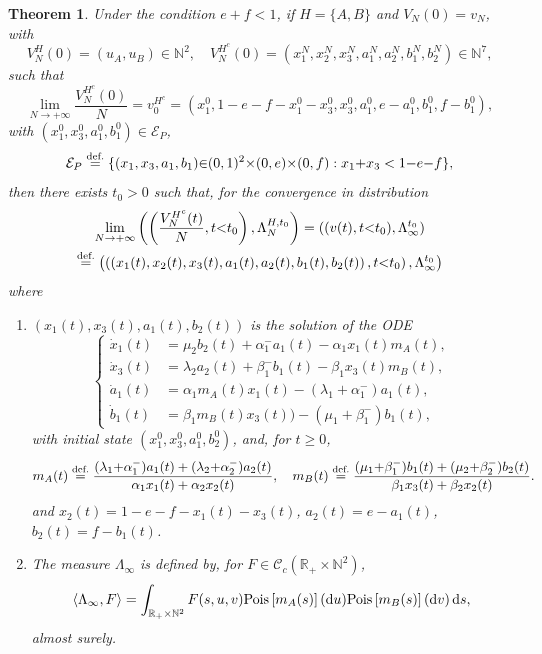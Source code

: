 \documentclass[english]{amsart}
\newcommand{\N}{\ensuremath{\mathbb{N}}}
\newcommand{\R}{\ensuremath{\mathbb{R}}}
\newcommand{\diff}{\mathop{}\mathopen{}\mathrm{d}}
\newcommand{\cal}[1]{\ensuremath{\mathcal{#1}}}
\newcommand\croc[1]{\left\langle #1\right\rangle}
\newcommand\steq[1]{\stackrel{\text{\rm #1.}}{=}}
\newcommand\Pois[1]{{\rm Pois}\left[#1\right]}
\newtheorem{theorem}[proposition]{Theorem}
\numberwithin{proposition}{section}
\begin{document}
\begin{theorem}\label{ThM1M}
Under the condition $e{+}f{<}1$, if $H{=}\{{ A}, { B}\}$ and $V_N(0){=}v_N$,  with
\[
V_N^H(0)=(u_A,u_B)\in\N^2, \quad V_N^{H^c}(0)=(x_1^N,x^N_2,x^N_3, a_1^N,a_2^N,b_1^N,b_2^N)\in\N^7,
\]
such that
\[
\lim_{N\to+\infty}\frac{V_N^{H^c}(0)}{N}=v_0^{H^c}=(x_1^0,1{-}e{-}f{-}x_1^0{-}x_3^0,x_3^0,a_1^0,e{-}a_1^0,b_1^0,f{-}b_1^0),
\]
with $(x_1^0,x_3^0,a_1^0,b_1^0){\in}{\cal E}_P$,
\[
{\cal E}_P\steq{def}\{(x_1,x_3,a_1,b_1){\in}(0,1)^2{\times}(0,e){\times}(0,f): x_1{+}x_3<1{-}e{-}f\},
\]
 then there exists $t_0{>}0$ such that, for the convergence in distribution
\begin{multline}\label{CVWM}
  \lim_{N\to+\infty}\left(\left(\frac{V_N^{H^c}(t)}{N}, t{<}t_0\right),\Lambda_N^{H,t_0}\right)=((v(t),t{<}t_0),\Lambda_\infty^{t_0})\\
\steq{def}\left(\left(\left({x}_1(t),{x}_2(t),{x}_3(t),{a}_1(t),{a}_2(t),{b}_1(t),{b}_2(t)\right), t{<}t_0\right),\Lambda_\infty^{t_0}\right)
\end{multline}
where
\begin{enumerate}
  \item  $({x}_1(t), {x}_3(t), {a}_1(t), {b}_2(t))$ is the solution of the ODE 
\begin{equation}\label{ODEM}
\begin{cases}
\dot{{x}}_1(t)&=\mu_2{b}_2(t){+}\alpha_1^-{a}_1(t){-}\alpha_1{x}_1(t) m_A(t),\\ 
\dot{{x}}_3(t)&= \lambda_2 {a}_2(t){+}\beta_1^-{b}_1(t){-}\beta_1{x}_3(t)m_B(t),\\
\dot{{a}}_1(t)&= \alpha_1m_A(t){x}_1(t){-}(\lambda_1{+}\alpha_1^-){a}_1(t),\\
\dot{{b}}_1(t)&=\beta_1m_B(t){x}_3(t)){-}(\mu_1{+}\beta_1^-){b}_1(t),
\end{cases}
\end{equation}
with  initial state $({x}_1^0, {x}_3^0, {a}_1^0, {b}_2^0)$,  and, for $t{\ge}0$,
\[
m_A(t)\steq{def}\frac{(\lambda_1{+}\alpha_1^-) {a}_1(t)+  (\lambda_2 {+}\alpha_2^-){a}_2(t)}{\alpha_1 {x}_1(t)+  \alpha_2 {x}_2(t)},\quad
m_B(t)\steq{def}\frac{(\mu_1{+}\beta_1^-) {b}_1(t)+  (\mu_2{+}\beta_2^-) {b}_2(t)}{\beta_1 {x}_3(t)+  \beta_2 {x}_2(t)}.
\]
and  $x_2(t){=}1{-}e{-}f{-}{x}_1(t){-}{x}_3(t)$, $a_2(t){=}e{-}{a}_1(t)$, $b_2(t){=}f{-}{b}_1(t)$.\\
\item The measure $\Lambda_\infty$ is defined by, for $F{\in}{\cal C}_c(\R_+{\times}\N^2)$, 
\[
  \croc{\Lambda_\infty,F}=\int_{\R_+{\times}\N^2} F(s,u,v)  \Pois{m_A(s)}(\diff u)\Pois{m_B(s)}(\diff v)\diff s,
  \]
  almost surely.
\end{enumerate}

\end{theorem}
\end{document}
